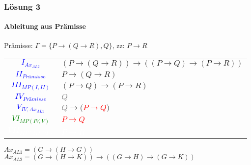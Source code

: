 \begin{frame}
	\frametitle{Lösung 3}
	\framesubtitle{Ableitung aus Prämisse}
	Prämisse: $\Gamma =\{P\rightarrow(Q\rightarrow R), Q\}$, zz: $P\rightarrow R$\\
	\begin{tabular}{cl}
		\textcolor{blue}{$I_{Ax_{AL2}}$}           & $(P\rightarrow(Q\rightarrow R))\rightarrow((P\rightarrow Q)\rightarrow(P\rightarrow R))$ \\
		\textcolor{blue}{$II_{\textit{Prämisse}}$} & $P\rightarrow(Q\rightarrow R)$                                                           \\
		\textcolor{blue}{$III_{MP(I, II)}$}        & $(P\rightarrow Q)\rightarrow(P\rightarrow R)$                                            \\
		\textcolor{blue}{$IV_{\textit{Prämisse}}$} & \textcolor{gray}{$Q$}                                                                    \\
		\textcolor{blue}{$V_{IV, Ax_{AL1}}$}       & \textcolor{gray}{$Q$}$\rightarrow($\textcolor{red}{$P\rightarrow Q$}$)$                  \\
		\textcolor{green}{$VI_{MP(IV, V)}$}        & \textcolor{red}{$P\rightarrow Q$}                                                        \\
		\textcolor{white}{$VII_{MP(III, VI)}$}     & \textcolor{white}{$P\rightarrow R$}                                                      \\
	\end{tabular}
	$Ax_{AL1} = (G\rightarrow(H\rightarrow G))$\\
	$Ax_{AL2} = (G\rightarrow(H\rightarrow K))\rightarrow((G\rightarrow H)\rightarrow(G\rightarrow K))$\\
\end{frame}
